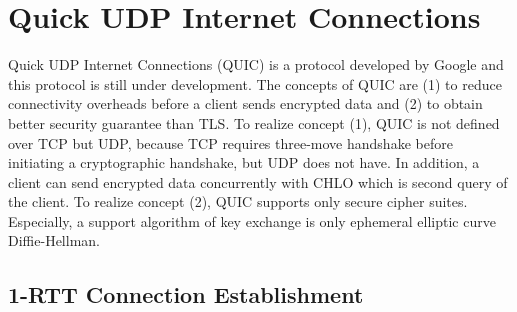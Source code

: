 \section{Quick UDP Internet Connections} \label{sec:quic}

Quick UDP Internet Connections (QUIC) is a protocol
developed by Google and this protocol is still under
development.
The concepts of QUIC are (1) to reduce connectivity
overheads before a client sends encrypted data and
(2) to obtain better security guarantee than TLS.
To realize concept (1), QUIC is not defined over
TCP but UDP, because TCP requires three-move handshake
before initiating a cryptographic handshake, but UDP
does not have. In addition, a client can send encrypted
data concurrently with CHLO which is second query of the
client.
To realize concept (2), QUIC supports only secure cipher
suites. Especially, a support algorithm of key exchange
is only ephemeral elliptic curve Diffie-Hellman.

\subsection{1-RTT Connection Establishment} \label{sec:quic_1rtt}

